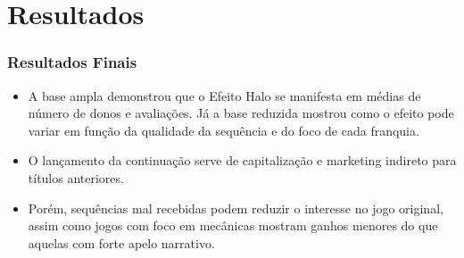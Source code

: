 \section{Resultados}
\begin{frame}
\frametitle{Resultados Finais}
\justifying

\begin{itemize}
    \item  A base ampla demonstrou que o Efeito Halo se manifesta em médias de número de donos e
    avaliações. Já a base reduzida mostrou como o
    efeito pode variar em função da qualidade da sequência e
    do foco de cada franquia.
    \vspace{0.2cm}

    \item O lançamento da continuação serve de capitalização e marketing indireto para 
    títulos anteriores.
    \vspace{0.2cm}

    \item Porém, sequências mal
    recebidas podem reduzir o interesse no jogo original, assim
    como jogos com foco em mecânicas mostram ganhos
    menores do que aquelas com forte apelo narrativo.
    \vspace{0.2cm}
\end{itemize}    
\end{frame}